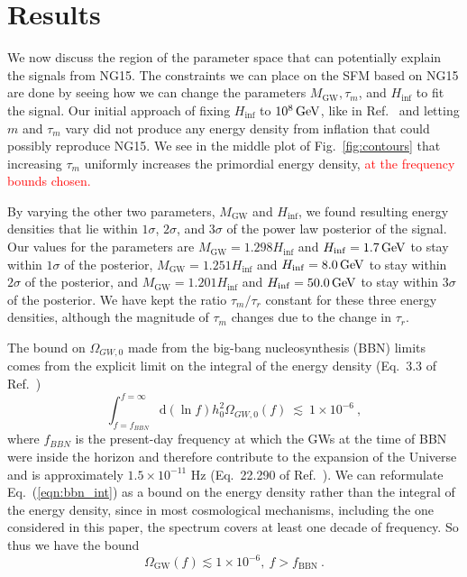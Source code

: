 \documentclass[prd,twocolumn,aps,psfig,nofootinbib,nobibnotes,superscriptaddress,preprintnumbers,times]{revtex4-2}
\def\red{\textcolor{red}}
\newcommand{\eq}[1]{(\ref{#1})}
\newcommand{\GeV}{\,{\rm GeV}}
\begin{document}
\section{Results}\label{sec:results}
We now discuss the region of the parameter space that can potentially explain the signals from NG15. The constraints we can place on the SFM based on NG15 are done by seeing how we can change the parameters $M_{\text{GW}}, \tau_m$, and $H_{\inf}$ to fit the signal. Our initial approach of fixing $H_{\inf}$ to $10^8 \GeV$, like in Ref.\ \cite{Fujita:2018ehq} and letting $m$ and $\tau_m$ vary did not produce any energy density from inflation that could possibly reproduce NG15. We see in the middle plot of Fig.\ \ref{fig:contours} that increasing $\tau_m$ uniformly increases the primordial energy density, \red{at the frequency bounds chosen. }

By varying the other two parameters, $M_{\text{GW}}$ and $H_{\inf}$, we found resulting energy densities that lie within $1\sigma$, $2\sigma$, and $3\sigma$ of the power law posterior of the signal. Our values for the parameters are $M_{\text{GW}} = 1.298H_{\inf}$ and $H_{\inf} =  1.7 \GeV$ to stay within $1\sigma$ of the posterior, $M_{\text{GW}} = 1.251H_{\inf}$ and $H_{\inf} = 8.0 \GeV$ to stay within $2\sigma$ of the posterior, and $M_{\text{GW}} = 1.201H_{\inf}$ and $H_{\inf} = 50.0 \GeV$ to stay within $3\sigma$ of the posterior. We have kept the ratio $\tau_m/\tau_r$ constant for these three energy densities, although the magnitude of $\tau_m$ changes due to the change in $\tau_r$. 

The bound on $\Omega_{GW,0}$ made from the big-bang nucleosynthesis (BBN) limits comes from the explicit limit on the integral of the energy density (Eq.\ 3.3 of Ref.\ \cite{Tanin:2020qjw}) 
\begin{equation} \label{eqn:bbn_int}
    \int_{f = f_{BBN}}^{f = \infty}\mbox{d}(\ln{f}) h_0^2\Omega_{GW,0}(f) \ \lesssim\ 1\times 10^{-6} \ ,
\end{equation} 
where $f_{BBN}$ is the present-day frequency at which the GWs at the time of BBN were inside the horizon and therefore contribute to the expansion of the Universe and is approximately $1.5\times 10^{-11}$ Hz (Eq.\ 22.290 of Ref.\ \cite{Maggiore:v2}). We can reformulate Eq.\ \eq{eqn:bbn_int} as a bound on the energy density rather than the integral of the energy density, since in most cosmological mechanisms, including the one considered in this paper, the spectrum covers at least one decade of frequency. So thus we have the bound 
\begin{equation}
    \Omega_{\text{GW}}(f) \lesssim 1 \times 10^{-6},\ f > f_{\text{BBN}} \ .
\end{equation}
\end{document}
